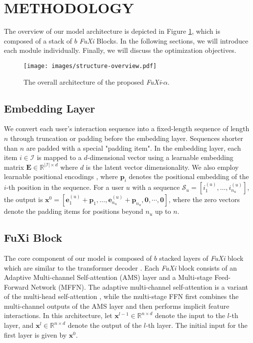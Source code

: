 \section{METHODOLOGY}

The overview of our model architecture is depicted in Figure \ref{fig:structure-overview}, which is composed of a stack of $b$ \textit{FuXi} Blocks. In the following sections, we will introduce each module individually. Finally, we will discuss the optimization objectives.

\begin{figure}
    \centering
    \setlength{\abovecaptionskip}{0mm}
    \setlength{\belowcaptionskip}{-3mm}
    \texttt{[image: images/structure-overview.pdf]}
    \caption{The overall architecture of the proposed \textit{FuXi}-$\alpha$.}
    \label{fig:structure-overview}
\end{figure}

\subsection{Embedding Layer}

We convert each user's interaction sequence into a fixed-length sequence of length $n$ through truncation or padding before the embedding layer. Sequences shorter than $n$ are padded with a special "padding item". 
In the embedding layer, each item $i \in \mathcal{I}$ is mapped to a $d$-dimensional vector using a learnable embedding matrix $\mathbf{E} \in \mathbb{R}^{|\mathcal{I}| \times d}$ where $d$ is the latent vector dimensionality. We also employ learnable positional encodings \cite{gehring2017convolutional}, where $\boldsymbol{p}_i$ denotes the positional embedding of the $i$-th position in the sequence. For a user $u$ with a sequence $\mathcal{S}_u = [i_1^{(u)}, \ldots, i_{n_u}^{(u)}]$, the output is $\mathbf{x}^{0} = [\mathbf{e}_1^{(u)} + \boldsymbol{p}_1, \ldots, \mathbf{e}_{n_u}^{(u)} + \boldsymbol{p}_{n_u}, \boldsymbol{0}, \cdots, \boldsymbol{0}]$, where the zero vectors denote the padding items for positions beyond $n_u$ up to $n$.

\subsection{FuXi Block}

The core component of our model is composed of $b$ stacked layers of \textit{FuXi} block which are similar to the transformer decoder \cite{transformer}. Each \textit{FuXi} block consists of an Adaptive Multi-channel Self-attention (AMS) layer and a Multi-stage Feed-Forward Network (MFFN). The adaptive multi-channel self-attention is a variant of the multi-head self-attention \cite{transformer}, while the multi-stage FFN first combines the multi-channel outputs of the AMS layer and then performs implicit feature interactions. 
In this architecture, let $\mathbf{x}^{l-1} \in \mathbb{R}^{n \times d}$ denote the input to the $l$-th layer, and $\mathbf{x}^{l} \in \mathbb{R}^{n \times d}$ denote the output of the $l$-th layer. The initial input for the first layer is given by $\mathbf{x}^{0}$.

